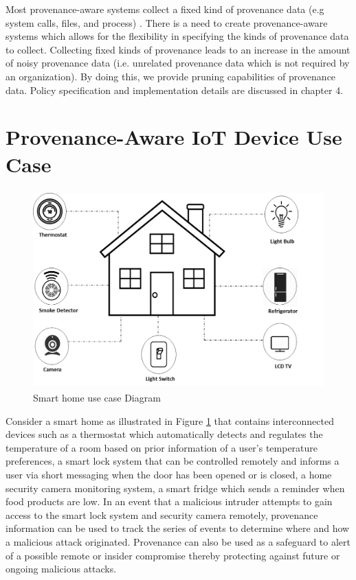 Most provenance-aware systems collect a fixed kind of provenance data (e.g system calls, files, and process)  \cite{King:2003:BI:945445.945467, altintas,glavic_case_2011}. There is a need to create provenance-aware systems which allows for the flexibility in specifying the kinds of provenance data to collect. Collecting fixed kinds of provenance leads to  an increase in the amount of noisy provenance data (i.e. unrelated provenance data which is not required by an organization). By doing this, we provide pruning capabilities \cite{braun2006issues} of provenance data. Policy specification and implementation details are discussed in chapter 4.  










\section{Provenance-Aware IoT Device Use Case}

\begin{figure}[tb]
\begin{center}
\includegraphics[height=3in]{smart_home_use_case.png}
\end{center}
\caption{Smart home use case Diagram}
\label{smart_home}
\end{figure}



Consider a smart home as illustrated in Figure \ref{smart_home} that contains interconnected devices such as a thermostat which automatically detects and regulates the temperature of a room based on prior information of a user's temperature preferences, a smart lock system that can be controlled remotely and informs a user via short messaging when the door has been opened or is closed, a home security camera monitoring system, a smart fridge which sends a reminder when food products are low. In an event that a malicious intruder attempts  to gain access to the smart lock system and security camera remotely, provenance information can be used to track the series  of events to determine where and how a malicious attack originated. Provenance can also be used as a safeguard to alert of a possible remote or insider compromise thereby protecting against future or ongoing malicious attacks. 





